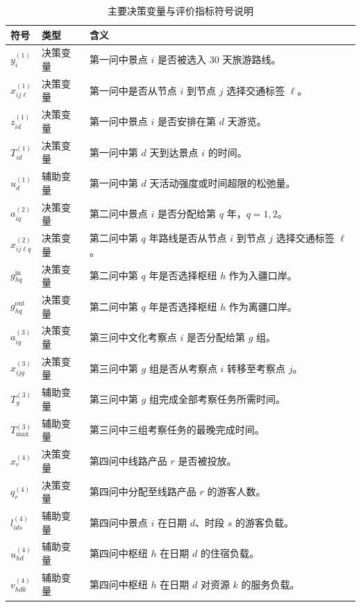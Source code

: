 \documentclass[UTF8,zihao=-4,a4paper]{ctexart}
\begin{document}
\begin{table}[htbp]
    \centering
    \caption{主要决策变量与评价指标符号说明}
    \label{tab:notation_variables}
    \small
    \renewcommand{\arraystretch}{1.18}
    \setlength{\tabcolsep}{5pt}
    \begin{tabularx}{\textwidth}{L{3.2cm} L{3.0cm} Y}
        \toprule
        符号 & 类型 & 含义 \\
        \midrule
        $y_i^{(1)}$ & 决策变量 & 第一问中景点 $i$ 是否被选入 $30$ 天旅游路线。 \\
        $x_{ij\ell}^{(1)}$ & 决策变量 & 第一问中是否从节点 $i$ 到节点 $j$ 选择交通标签 $\ell$。 \\
        $z_{id}^{(1)}$ & 决策变量 & 第一问中景点 $i$ 是否安排在第 $d$ 天游览。 \\
        $T_{id}^{(1)}$ & 决策变量 & 第一问中第 $d$ 天到达景点 $i$ 的时间。 \\
        $u_d^{(1)}$ & 辅助变量 & 第一问中第 $d$ 天活动强度或时间超限的松弛量。 \\
        $a_{iq}^{(2)}$ & 决策变量 & 第二问中景点 $i$ 是否分配给第 $q$ 年，$q=1,2$。 \\
        $x_{ij\ell q}^{(2)}$ & 决策变量 & 第二问中第 $q$ 年路线是否从节点 $i$ 到节点 $j$ 选择交通标签 $\ell$。 \\
        $g_{hq}^{\mathrm{in}}$ & 决策变量 & 第二问中第 $q$ 年是否选择枢纽 $h$ 作为入疆口岸。 \\
        $g_{hq}^{\mathrm{out}}$ & 决策变量 & 第二问中第 $q$ 年是否选择枢纽 $h$ 作为离疆口岸。 \\
        $a_{ig}^{(3)}$ & 决策变量 & 第三问中文化考察点 $i$ 是否分配给第 $g$ 组。 \\
        $x_{ijg}^{(3)}$ & 决策变量 & 第三问中第 $g$ 组是否从考察点 $i$ 转移至考察点 $j$。 \\
        $T_g^{(3)}$ & 辅助变量 & 第三问中第 $g$ 组完成全部考察任务所需时间。 \\
        $T_{\max}^{(3)}$ & 辅助变量 & 第三问中三组考察任务的最晚完成时间。 \\
        $x_r^{(4)}$ & 决策变量 & 第四问中线路产品 $r$ 是否被投放。 \\
        $q_r^{(4)}$ & 决策变量 & 第四问中分配至线路产品 $r$ 的游客人数。 \\
        $l_{i d s}^{(4)}$ & 辅助变量 & 第四问中景点 $i$ 在日期 $d$、时段 $s$ 的游客负载。 \\
        $u_{h d}^{(4)}$ & 辅助变量 & 第四问中枢纽 $h$ 在日期 $d$ 的住宿负载。 \\
        $v_{h d k}^{(4)}$ & 辅助变量 & 第四问中枢纽 $h$ 在日期 $d$ 对资源 $k$ 的服务负载。 \\

\end{tabularx}
\end{table}
\end{document}

